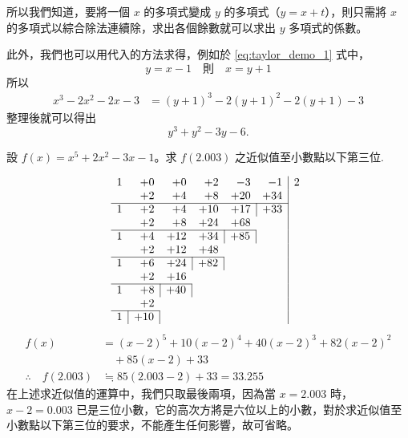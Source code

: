 所以我們知道，要將一個 $x$ 的多項式變成 $y$ 的多項式（$y=x+t$），則只需將 $x$ 的多項式以綜合除法連續除，求出各個餘數就可以求出 $y$ 多項式的係數。

此外，我們也可以用代入的方法求得，例如於 \eqref{eq:taylor_demo_1} 式中，
\begin{equation*}
  y = x-1 \quad \text{則} \quad x = y+1
\end{equation*}
所以
\begin{align*}
  x^3-2x^2-2x-3 &= (y+1)^3 - 2(y+1)^2 - 2(y+1) - 3
\end{align*}
整理後就可以得出
\begin{equation*}
  y^3+y^2-3y-6.
\end{equation*}

\begin{example}\label{ex:5-4-9}
設 $f(x)=x^5+2x^2-3x-1$。求 $f(2.003)$ 之近似值至小數點以下第三位.
\end{example}

\begin{solution*}
\begin{equation*}
\begin{array}{rrrrrr|r}
  1 & +0 & +0 & +2 & -3 & -1 & 2 \\
    & +2 & +4 & +8 & +20 & +34 & \\ \cline{1-6}
  1 & +2 & +4 & +10 & +17 & \multicolumn{1}{|r|}{+33} & \\
    & +2 & +8 & +24 & +68 & & \\ \cline{1-5}
  1 & +4 & +12 & +34 & \multicolumn{1}{|r|}{+85} & & \\
    & +2 & +12 & +48 & & & \\ \cline{1-4}
  1 & +6 & +24 & \multicolumn{1}{|r|}{+82} & & & \\
    & +2 & +16 & & & & \\ \cline{1-3}
  1 & +8 & \multicolumn{1}{|r|}{+40} & & & & \\
    & +2 & & & & & \\ \cline{1-2}
  1 & \multicolumn{1}{|r|}{+10} & & & & &
\end{array}
\end{equation*}
\begin{align*}
  f(x) &= (x-2)^5 + 10(x-2)^4 + 40(x-2)^3 + 82(x-2)^2 \\
  &\quad + 85(x-2) + 33 \\
  \therefore \quad f(2.003) &\fallingdotseq 85(2.003-2) + 33 = 33.255
\end{align*}
在上述求近似值的運算中，我們只取最後兩項，因為當 $x=2.003$ 時，$x-2=0.003$ 已是三位小數，它的高次方將是六位以上的小數，對於求近似值至小數點以下第三位的要求，不能產生任何影響，故可省略。
\end{solution*}

